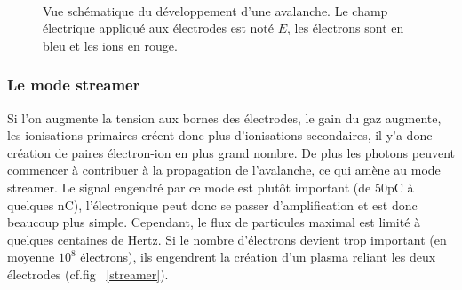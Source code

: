 \begin{figure}[ht!]
\centering
{}
\hfill
{}
\\
\hfill
{}
\caption{Vue schématique du développement d'une avalanche. Le champ électrique appliqué aux électrodes est noté $E$, les électrons sont en bleu et les ions en rouge.}
\label{avalanche}
\end{figure}

\subsubsection{Le mode streamer}

Si l'on augmente la tension aux bornes des électrodes, le gain du gaz augmente, les ionisations primaires créent donc plus d'ionisations secondaires, il y'a donc création de paires électron-ion en plus grand nombre. De plus les photons peuvent commencer à contribuer à la propagation de l'avalanche, ce qui amène au mode streamer. Le signal engendré par ce mode est plutôt important (de 50pC à quelques nC), l'électronique peut donc se passer d'amplification et est donc beaucoup plus simple. Cependant, le flux de particules maximal est limité à quelques centaines de Hertz. Si le nombre d'électrons devient trop important (en moyenne $10^{8}$ électrons), ils engendrent la création d'un plasma reliant les deux électrodes (cf.fig~ \ref{streamer}).

